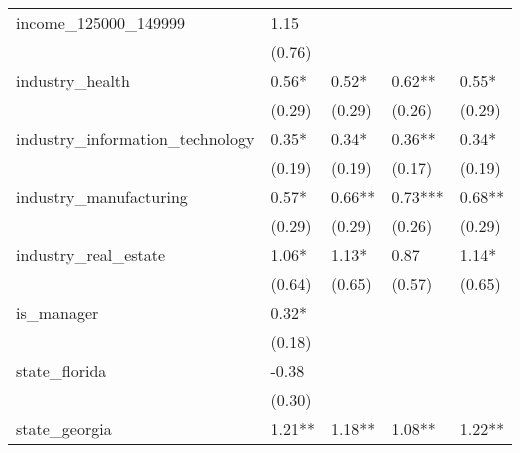 \begin{table}
\begin{center}
\begin{tabular}{lllll}
income\_125000\_149999                    & 1.15                &                      &                       &                         \\
                                          & (0.76)              &                      &                       &                         \\
industry\_health                          & 0.56*               & 0.52*                & 0.62**                & 0.55*                   \\
                                          & (0.29)              & (0.29)               & (0.26)                & (0.29)                  \\
industry\_information\_technology         & 0.35*               & 0.34*                & 0.36**                & 0.34*                   \\
                                          & (0.19)              & (0.19)               & (0.17)                & (0.19)                  \\
industry\_manufacturing                   & 0.57*               & 0.66**               & 0.73***               & 0.68**                  \\
                                          & (0.29)              & (0.29)               & (0.26)                & (0.29)                  \\
industry\_real\_estate                    & 1.06*               & 1.13*                & 0.87                  & 1.14*                   \\
                                          & (0.64)              & (0.65)               & (0.57)                & (0.65)                  \\
is\_manager                               & 0.32*               &                      &                       &                         \\
                                          & (0.18)              &                      &                       &                         \\
state\_florida                            & -0.38               &                      &                       &                         \\
                                          & (0.30)              &                      &                       &                         \\
state\_georgia                            & 1.21**              & 1.18**               & 1.08**                & 1.22**                  \\

\end{tabular}
\end{center}
\end{table}
